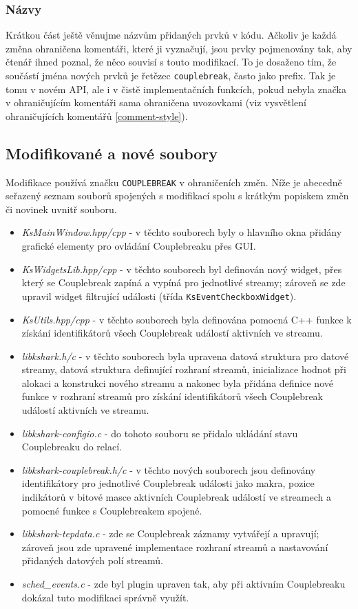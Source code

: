 \subsubsection*{Názvy}
Krátkou část ještě věnujme názvům přidaných prvků v kódu. Ačkoliv je každá změna ohraničena komentáři, které ji vyznačují, jsou prvky pojmenovány tak, aby čtenář ihned poznal, že něco souvisí s touto modifikací. To je dosaženo tím, že součástí jména nových prvků je řetězec \texttt{couplebreak}, často jako prefix. Tak je tomu v novém API, ale i v čistě implementačních funkcích, pokud nebyla značka v ohraničujícím komentáři sama ohraničena uvozovkami (viz vysvětlení ohraničujících komentářů \ref{comment-style}).

\subsection{Modifikované a nové soubory}
Modifikace používá značku \texttt{COUPLEBREAK} v ohraničeních změn. Níže je abecedně seřazený seznam souborů spojených s modifikací  spolu s krátkým popiskem změn či novinek uvnitř souboru.
\begin{itemize}
    \item \emph{KsMainWindow.hpp/cpp} - v těchto souborech byly o hlavního okna přidány grafické elementy pro ovládání Couplebreaku přes GUI.
    \item \emph{KsWidgetsLib.hpp/cpp} - v těchto souborech byl definován nový widget, přes který se Couplebreak zapíná a vypíná pro jednotlivé streamy; zároveň se zde upravil widget filtrující události (třída \verb|KsEventCheckboxWidget|).
    \item \emph{KsUtils.hpp/cpp} - v těchto souborech byla definována pomocná C++ funkce k získání identifikátorů všech Couplebreak událostí aktivních ve streamu.
    \item \emph{libkshark.h/c} - v těchto souborech byla upravena datová struktura pro datové streamy, datová struktura definující rozhraní streamů, inicializace hodnot při alokaci a konstrukci nového streamu a nakonec byla přidána definice nové funkce v rozhraní streamů pro získání identifikátorů všech Couplebreak událostí aktivních ve streamu.
    \item \emph{libkshark-configio.c} - do tohoto souboru se přidalo ukládání stavu Couplebreaku do relací.
    \item \emph{libkshark-couplebreak.h/c} - v těchto nových souborech jsou definovány identifikátory pro jednotlivé Couplebreak události jako makra, pozice indikátorů v bitové masce aktivních Couplebreak událostí ve streamech a pomocné funkce s Couplebreakem spojené.
    \item \emph{libkshark-tepdata.c} - zde se Couplebreak záznamy vytvářejí a upravují; zároveň jsou zde upravené implementace rozhraní streamů a nastavování přidaných datových polí streamů.
    \item \emph{sched\_events.c} - zde byl plugin upraven tak, aby při aktivním Couplebreaku dokázal tuto modifikaci správně využít.
\end{itemize}


